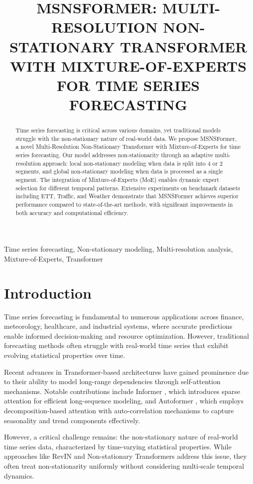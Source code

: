 \documentclass{article}
\title{MSNSFORMER: MULTI-RESOLUTION NON-STATIONARY TRANSFORMER WITH MIXTURE-OF-EXPERTS FOR TIME SERIES FORECASTING}
\begin{document}
%
\maketitle
%
\begin{abstract}
Time series forecasting is critical across various domains, yet traditional models struggle with the non-stationary nature of real-world data. We propose MSNSFormer, a novel Multi-Resolution Non-Stationary Transformer with Mixture-of-Experts for time series forecasting. Our model addresses non-stationarity through an adaptive multi-resolution approach: local non-stationary modeling when data is split into 4 or 2 segments, and global non-stationary modeling when data is processed as a single segment. The integration of Mixture-of-Experts (MoE) enables dynamic expert selection for different temporal patterns. Extensive experiments on benchmark datasets including ETT, Traffic, and Weather demonstrate that MSNSFormer achieves superior performance compared to state-of-the-art methods, with significant improvements in both accuracy and computational efficiency.
\end{abstract}
%
\begin{keywords}
Time series forecasting, Non-stationary modeling, Multi-resolution analysis, Mixture-of-Experts, Transformer
\end{keywords}
%
\section{Introduction}
\label{sec:intro}

Time series forecasting is fundamental to numerous applications across finance, meteorology, healthcare, and industrial systems, where accurate predictions enable informed decision-making and resource optimization. However, traditional forecasting methods often struggle with real-world time series that exhibit evolving statistical properties over time.

Recent advances in Transformer-based architectures have gained prominence due to their ability to model long-range dependencies through self-attention mechanisms. Notable contributions include Informer \cite{informer}, which introduces sparse attention for efficient long-sequence modeling, and Autoformer \cite{autoformer}, which employs decomposition-based attention with auto-correlation mechanisms to capture seasonality and trend components effectively.

However, a critical challenge remains: the non-stationary nature of real-world time series data, characterized by time-varying statistical properties. While approaches like RevIN \cite{revin} and Non-stationary Transformers \cite{nonstationary} address this issue, they often treat non-stationarity uniformly without considering multi-scale temporal dynamics.
\end{document}
